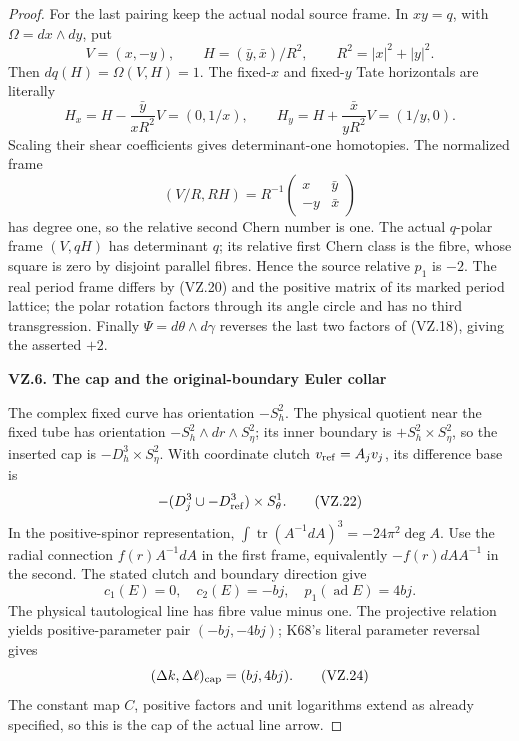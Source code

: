 \begin{proof}
For the last pairing keep the actual nodal source frame. In \(xy=q\),
with \(\Omega=dx\wedge dy\), put
\[
 V=(x,-y),\qquad H=(\bar y,\bar x)/R^2,\qquad R^2=|x|^2+|y|^2.
\]
Then \(dq(H)=\Omega(V,H)=1\). The fixed-\(x\) and fixed-\(y\) Tate
horizontals are literally
\[
 H_x=H-\frac{\bar y}{xR^2}V=(0,1/x),\qquad
 H_y=H+\frac{\bar x}{yR^2}V=(1/y,0).                  \tag{VZ.20}
\]
Scaling their shear coefficients gives determinant-one homotopies.
The normalized frame
\[
 (V/R,RH)=R^{-1}
 \begin{pmatrix}x&\bar y\\-y&\bar x\end{pmatrix}
                                                               \tag{VZ.21}
\]
has degree one, so the relative second Chern number is one.
The actual \(q\)-polar frame \((V,qH)\) has determinant \(q\);
its relative first Chern class is the fibre, whose square is zero
by disjoint parallel fibres. Hence the source relative \(p_1\) is
\(-2\). The real period frame differs by (VZ.20) and the positive
matrix of its marked period lattice; the polar rotation factors
through its angle circle and has no third transgression.
Finally \(\Psi=d\theta\wedge d\gamma\) reverses the last two factors
of (VZ.18), giving the asserted \(+2\).

\par

\medskip\noindent\textbf{VZ.6. The cap and the original-boundary Euler collar}

\par\nobreak

The complex fixed curve has orientation \(-S^2_h\). The physical
quotient near the fixed tube has orientation
\(-S^2_h\wedge dr\wedge S^2_\eta\); its inner boundary is
\(+S^2_h\times S^2_\eta\), so the inserted cap is
\(-D^3_h\times S^2_\eta\). With coordinate clutch
\(v_{\rm ref}=A_jv_j\), its difference base is
\[
 -(D^3_j\cup-D^3_{\rm ref})\times S^1_\theta.         \tag{VZ.22}
\]
In the positive-spinor representation,
\(\int\operatorname{tr}(A^{-1}dA)^3=-24\pi^2\deg A\).
Use the radial connection \(f(r)A^{-1}dA\) in the first frame,
equivalently \(-f(r)dA A^{-1}\) in the second. The stated clutch
and boundary direction give
\[
 c_1(E)=0,\quad c_2(E)=-bj,\quad
 p_1(\operatorname{ad}E)=4bj.                        \tag{VZ.23}
\]
The physical tautological line has fibre value minus one.
The projective relation yields positive-parameter pair
\((-bj,-4bj)\); K68's literal parameter reversal gives
\[
                 (\Delta k,\Delta\ell)_{\rm cap}=(bj,4bj).
                                                               \tag{VZ.24}
\]
The constant map \(C\), positive factors and unit logarithms extend
as already specified, so this is the cap of the actual line arrow.


\end{proof}
